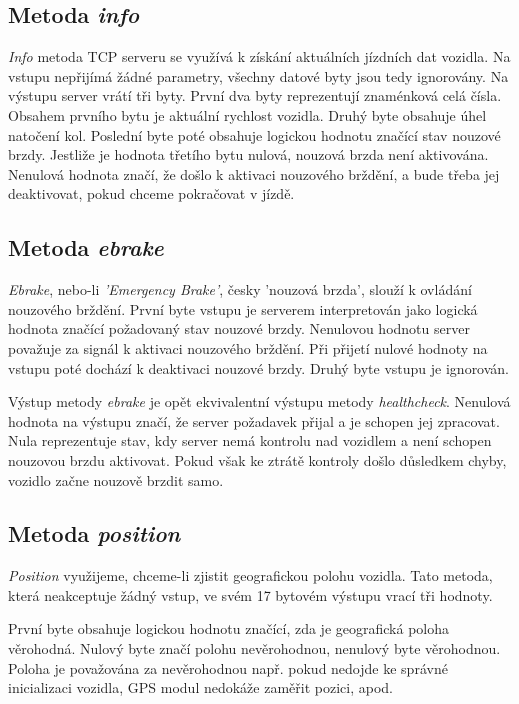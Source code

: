 \documentclass[czech, bachelor]{diploma}
\begin{document}
\subsection{Metoda \emph{info}}
\emph{Info} metoda TCP serveru se využívá k získání aktuálních jízdních dat vozidla. Na vstupu nepřijímá žádné parametry, všechny
datové byty jsou tedy ignorovány. Na výstupu server vrátí tři byty. První dva byty reprezentují znaménková celá čísla. Obsahem
prvního bytu je aktuální rychlost vozidla. Druhý byte obsahuje úhel natočení kol. Poslední byte poté obsahuje logickou hodnotu
značící stav nouzové brzdy. Jestliže je hodnota třetího bytu nulová, nouzová brzda není aktivována. Nenulová hodnota značí,
že došlo k aktivaci nouzového brždění, a bude třeba jej deaktivovat, pokud chceme pokračovat v jízdě.

\subsection{Metoda \emph{ebrake}}
\emph{Ebrake}, nebo-li \emph{'Emergency Brake'}, česky 'nouzová brzda', slouží k ovládání nouzového brždění. První byte vstupu
je serverem interpretován jako logická hodnota značící požadovaný stav nouzové brzdy. Nenulovou hodnotu server považuje za signál
k aktivaci nouzového brždění. Při přijetí nulové hodnoty na vstupu poté dochází k deaktivaci nouzové brzdy. Druhý byte vstupu
je ignorován.

Výstup metody \emph{ebrake} je opět ekvivalentní výstupu metody \emph{healthcheck}. Nenulová hodnota na výstupu značí, že server
požadavek přijal a je schopen jej zpracovat. Nula reprezentuje stav, kdy server nemá kontrolu nad vozidlem a není schopen
nouzovou brzdu aktivovat. Pokud však ke ztrátě kontroly došlo důsledkem chyby, vozidlo začne nouzově brzdit samo.

\subsection{Metoda \emph{position}}

\emph{Position} využijeme, chceme-li zjistit geografickou polohu vozidla. Tato metoda, která neakceptuje žádný vstup, ve svém
17 bytovém výstupu vrací tři hodnoty.

První byte obsahuje logickou hodnotu značící, zda je geografická poloha věrohodná. Nulový byte značí polohu nevěrohodnou,
nenulový byte věrohodnou. Poloha je považována za nevěrohodnou např. pokud nedojde ke správné inicializaci vozidla, GPS modul
nedokáže zaměřit pozici, apod.
\end{document}
